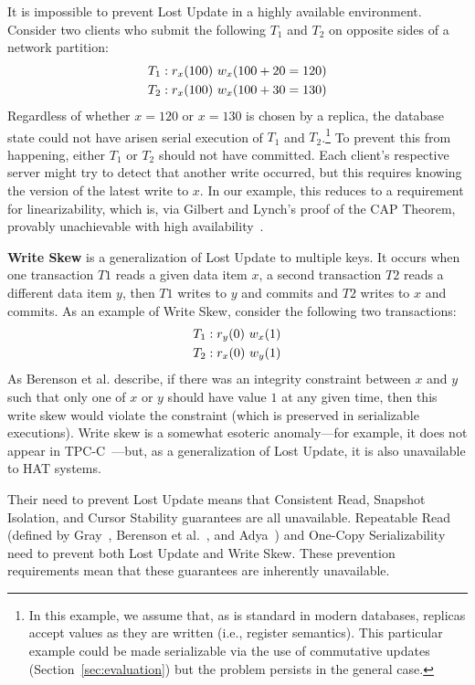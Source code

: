 It is impossible to prevent Lost Update in a highly available
environment. Consider two clients who submit the following $T_1$ and
$T_2$ on opposite sides of a network partition:
\begin{align*}
\small\vspace{-1em}
T_1 &: r_x(100)~w_x(100+20=120)
\\T_2 &: r_x(100)~w_x(100+30=130)\vspace{-1em}
\end{align*}
Regardless of whether $x=120$ or $x=130$ is chosen by a replica, the
database state could not have arisen serial execution of $T_1$ and
$T_2$.\footnote{In this example, we assume that, as is standard in
  modern databases, replicas accept values as they are written (i.e.,
  register semantics). This particular example could be made
  serializable via the use of commutative updates
  (Section~\ref{sec:evaluation}) but the problem persists in the
  general case.}  To prevent this from happening, either $T_1$ or
$T_2$ should not have committed. Each client's respective server might
try to detect that another write occurred, but this requires knowing
the version of the latest write to $x$. In our example, this reduces
to a requirement for linearizability, which is, via Gilbert and
Lynch's proof of the CAP Theorem, provably unachievable with high
availability~\cite{gilbert-cap}.

\textbf{Write Skew} is a generalization of Lost Update to multiple
keys. It occurs when one transaction $T1$ reads a given data item $x$,
a second transaction $T2$ reads a different data item $y$, then $T1$
writes to $y$ and commits and $T2$ writes to $x$ and commits. As an
example of Write Skew, consider the following two transactions:
\begin{align*}
\small
T_1 &: r_y(0)~w_x(1)
\\T_2 &: r_x(0)~w_y(1)
\end{align*}
As Berenson et al. describe, if there was an integrity constraint
between $x$ and $y$ such that only one of $x$ or $y$ should have value
$1$ at any given time, then this write skew would violate the constraint (which is preserved in serializable executions). Write skew is a somewhat
esoteric anomaly---for example, it does not appear in
TPC-C~\cite{snapshot-serializable}---but, as a generalization of Lost
Update, it is also unavailable to HAT systems.

Their need to prevent Lost Update means that Consistent Read, Snapshot
Isolation, and Cursor Stability guarantees are all unavailable.
Repeatable Read (defined by Gray~\cite{gray-isolation}, Berenson et
al.~\cite{ansicritique}, and Adya~\cite{adya}) and One-Copy
Serializability need to prevent both Lost Update and Write Skew. These
prevention requirements mean that these guarantees are inherently
unavailable.

